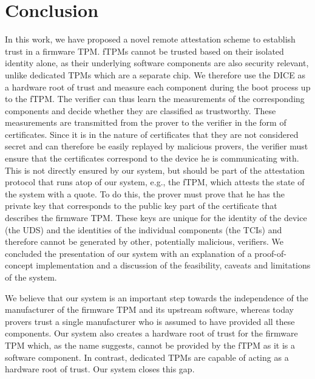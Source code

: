 \section{Conclusion}

In this work, we have proposed a novel remote attestation scheme to establish trust in a firmware TPM\@.
fTPMs cannot be trusted based on their isolated identity alone, as their underlying software components are also security relevant, unlike dedicated TPMs which are a separate chip.
We therefore use the DICE as a hardware root of trust and measure each component during the boot process up to the fTPM\@.
The verifier can thus learn the measurements of the corresponding components and decide whether they are classified as trustworthy.
These measurements are transmitted from the prover to the verifier in the form of certificates.
Since it is in the nature of certificates that they are not considered secret and can therefore be easily replayed by malicious provers, the verifier must ensure that the certificates correspond to the device he is communicating with.
This is not directly ensured by our system, but should be part of the attestation protocol that runs atop of our system, e.g., the fTPM, which attests the state of the system with a quote.
To do this, the prover must prove that he has the private key that corresponds to the public key part of the certificate that describes the firmware TPM\@.
These keys are unique for the identity of the device (the UDS) and the identities of the individual components (the TCIs) and therefore cannot be generated by other, potentially malicious, verifiers.
We concluded the presentation of our system with an explanation of a proof-of-concept implementation and a discussion of the feasibility, caveats and limitations of the system.

We believe that our system is an important step towards the independence of the manufacturer of the firmware TPM and its upstream software, whereas today provers trust a single manufacturer who is assumed to have provided all these components.
Our system also creates a hardware root of trust for the firmware TPM which, as the name suggests, cannot be provided by the fTPM as it is a software component.
In contrast, dedicated TPMs are capable of acting as a hardware root of trust.
Our system closes this gap.
